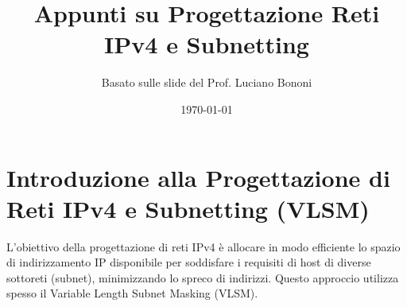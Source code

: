 


\title{Appunti su Progettazione Reti IPv4 e Subnetting}
\author{Basato sulle slide del Prof. Luciano Bononi}
\date{\today}



\maketitle
\tableofcontents
\newpage

\section{Introduzione alla Progettazione di Reti IPv4 e Subnetting (VLSM)}
L'obiettivo della progettazione di reti IPv4 è allocare in modo efficiente lo spazio di indirizzamento IP disponibile per soddisfare i requisiti di host di diverse sottoreti (subnet), minimizzando lo spreco di indirizzi. Questo approccio utilizza spesso il Variable Length Subnet Masking (VLSM).

